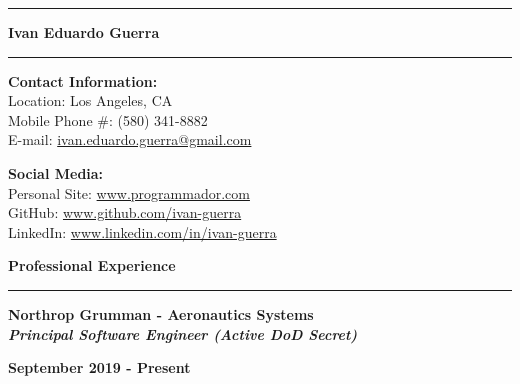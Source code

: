 \documentclass[12pt,letterpaper]{article}
\begin{document}

\hrule
\begin{center}
    \begin{LARGE}
        \textbf{Ivan Eduardo Guerra}
    \end{LARGE}
\end{center}
\hrule

\medskip

\begin{minipage}[t]{0.5\textwidth}
    \begin{flushleft}
        \textbf{Contact Information:}\\
        Location: Los Angeles, CA\\
        Mobile Phone \#: (580) 341-8882\\
        E-mail:
            \href{mailto:ivan.eduardo.guerra@gmail.com}{ivan.eduardo.guerra@gmail.com}
    \end{flushleft}
\end{minipage}
\begin{minipage}[t]{0.46\textwidth}
    \begin{flushright}
        \begin{flushleft}
            \textbf{Social Media:}\\
            Personal Site: \url{www.programmador.com}\\
            GitHub: \url{www.github.com/ivan-guerra}\\
            LinkedIn: \url{www.linkedin.com/in/ivan-guerra}
        \end{flushleft}
    \end{flushright}
\end{minipage}

\medskip

\begin{large}
    \textbf{Professional Experience}
\end{large}

\smallskip \hrule \medskip

\begin{minipage}[t]{0.53\textwidth}
    \begin{flushleft}
        \textbf{Northrop Grumman - Aeronautics Systems}\\
        \textbf{\textit{Principal Software Engineer (Active DoD Secret)}}\\
    \end{flushleft}
\end{minipage}
\begin{minipage}[t]{0.43\textwidth}
    \begin{flushright}
        \textbf{September 2019 - Present}
    \end{flushright}
\end{minipage}
\end{document}
